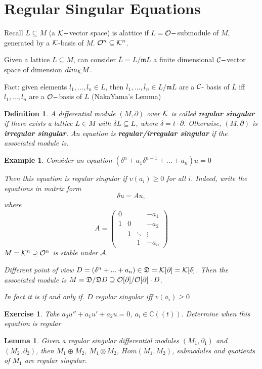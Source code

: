 \documentclass[11pt]{article}
\newtheorem{lemma}[thm]{Lemma}
\newtheorem{exercise}[thm]{Exercise}
\newtheorem{dfn}[thm]{Definition}
\newtheorem{ex}[thm]{Example}
\newcommand{\pd}{\partial}
\newcommand{\cplx}{\mathbb C}
\newcommand{\scm}{{\mathfrak m}}
\newcommand{\frakd}{{\mathfrak D}}
\newcommand{\cala}{{\cal A}}
\newcommand{\calc}{{\cal C}}
\newcommand{\calk}{{\cal K}}
\newcommand{\calo}{{\cal O}}
\begin{document}
\section{Regular Singular Equations}
Recall $L\subseteq M$ (a $\calk-$vector space) is  alattice if $L=\calo-$submodule of $M$, generated by a $\calk$-basis of $M$. $\calo^n\subseteq \calk^n$.

Given a lattice $L\subseteq M$, can consider $\overline{L}=L/\scm L$ a finite dimensional $\calc-$vector space of dimension $dim_\calk M$.

Fact: given elements $l_1,...,l_n\in L$, then $\overline{l}_1,...,\overline{l}_n\in L/\scm L$ are a $\calc$- basis of $\overline{L}$ iff $l_1,...,l_n$ are a $\calo-$basis of $L$ (NakaYama's Lemma)

\begin{dfn}
A differential module $(M,\pd)$ over $\calk$ is called \textbf{regular singular} if there exists a lattice $L\in M$ with $\delta L\subseteq L$, where $\delta=t\cdot \pd$. Otherwise, $(M,\pd)$ is \textbf{irregular singular}. An equation is \textbf{regular/irregular singular } if the associated module is.
\end{dfn} 
\begin{ex}
Consider an equation $(\delta^n+a_1\delta^{n-1}+...+a_n)u=0$

Then this equation is regular singular if $v(a_i)\geq 0$ for all $i$. Indeed, write the equations in matrix form 
$$
\delta u= Au,
$$
where
$$
A=
\begin{pmatrix}
0 &  &  & -a_{1}\\
1 & 0 &  & -a_{2}\\
 & 1 & \ddots  & \vdots \\
 &  & 1 & -a_{n}
\end{pmatrix}
$$
$M=\calk^n\supseteq \calo^n$ is stable under $\cala$.

Different point of view $D=(\delta^n+...+a_n)\in\frakd=\calk[\pd]=\calk[\delta]$. Then the associated module is $M=\frakd/\frakd D\supseteq \calo[\pd]/\calo[\pd]\cdot D$.

In fact it is if and only if. $D$ regular singular iff $v(a_i)\geq 0$
\end{ex}

\begin{exercise}
Take $a_0 u''+a_1 u'+a_2 u=0$, $a_i\in\cplx((t)).$ Determine when this equation is regular
\end{exercise}
\begin{lemma}
Given a regular singular differential modules $(M_1,\pd_1)$ and $(M_2,\pd_2)$, then $M_1\oplus M_2$, $M_1\otimes M_2$, $Hom(M_1,M_2)$, submodules and quotients of $M_1$ are regular singular.
\end{lemma}
\end{document}

